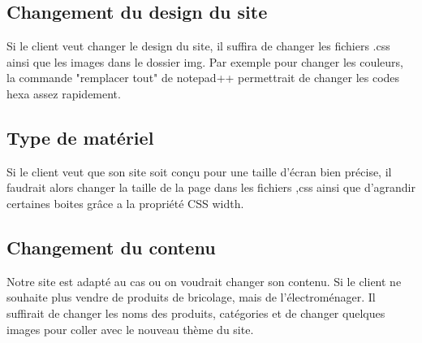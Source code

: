 \subsection{Changement du design du site}
	Si le client veut changer le design du site, il suffira de changer les fichiers .css ainsi que les images dans le dossier img. Par exemple pour changer les couleurs, la commande "remplacer tout" de notepad++ permettrait de changer les codes hexa assez rapidement.

\subsection{Type de matériel}
	Si le client veut que son site soit conçu pour une taille d'écran bien précise, il faudrait alors changer la taille de la page dans les fichiers ,css ainsi que d'agrandir certaines boites grâce a la propriété CSS width.

\subsection{Changement du contenu}
	Notre site est adapté au cas ou on voudrait changer son contenu. Si le client ne souhaite plus vendre de produits de bricolage, mais de l'électroménager.
Il suffirait de changer les noms des produits, catégories et de changer quelques images pour coller avec le nouveau thème du site.	
